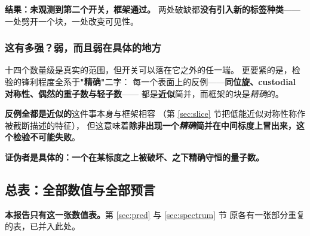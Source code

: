 \documentclass[11pt,a4paper]{article}
\theoremstyle{sudef}
\begin{document}
\begin{mdframed}[linecolor=axcol,linewidth=1.2pt,backgroundcolor=axcol!6]
\textbf{结果：未观测到第二个开关，框架通过。}
两处破缺都\textbf{没有引入新的标签种类}——一处劈开一个块，一处改变可见性。
\end{mdframed}

\subsubsection*{这有多强？弱，而且弱在具体的地方}

十四个数量级是真实的范围，但开关可以落在它之外的任一端。
更要紧的是，检验的锋利程度全系于\textbf{"精确"}二字：
每一个表面上的反例——\textbf{同位旋、custodial 对称性、偶然的重子数与轻子数}——
都是\textbf{近似}简并，而框架的块是\emph{精确}的。

\textbf{反例全都是近似的}这件事本身与框架相容
（第 \ref{sec:slice} 节把低能近似对称性称作被截断描述的特征），
但这意味着\textbf{除非出现一个\emph{精确}简并在中间标度上冒出来，这个检验不可能失败}。

\begin{center}
\textbf{证伪者是具体的：一个在某标度之上被破坏、之下精确守恒的量子数。}
\end{center}

\subsection{总表：全部数值与全部预言}\label{ss:scoreboard}

\textbf{本报告只有这一张数值表。}第 \ref{sec:pred} 与 \ref{sec:spectrum} 节
原各有一张部分重复的表，已并入此处。
\end{document}
